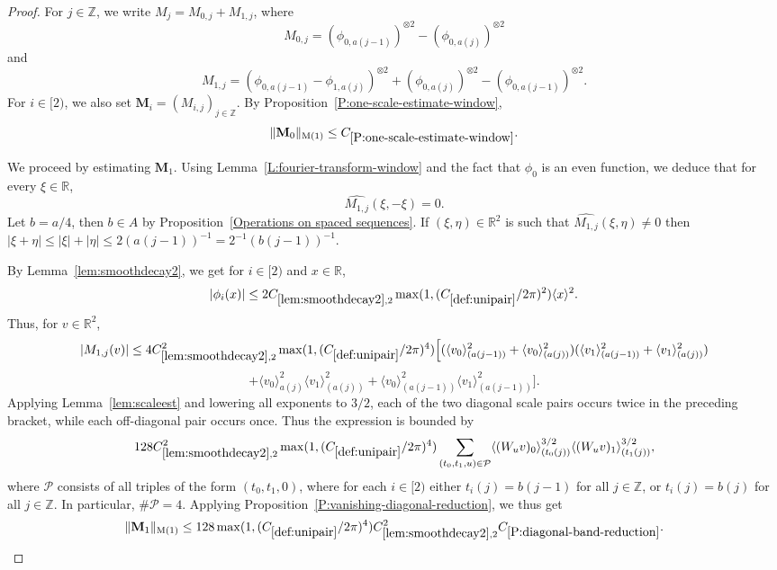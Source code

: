 \documentclass[12pt,reqno]{amsart}
\theoremstyle{plain}
\numberwithin{equation}{section}
\theoremstyle{remark}
\newcommand{\Z}{{\mathbb Z}}
\newcommand{\R}{{\mathbb R}}
\begin{document}
\begin{proof}
For $j\in \Z$, we write $M_j=M_{0,j}+M_{1,j}$, where
\[
M_{0,j}= ({\phi}_{0,a(j-1)})^{\otimes 2} -({\phi}_{0,a(j)})^{\otimes 2}
\]
and
\[
M_{1,j}=({\phi}_{0,a(j-1)}-{\phi}_{1,a(j)})^{\otimes 2} + ({\phi}_{0,a(j)})^{\otimes 2} -({\phi}_{0,a(j-1)})^{\otimes 2}.
\]
For $i\in [2)$, we also set $\mathbf{M}_i=(M_{i,j})_{j\in \Z}$. By Proposition~\ref{P:one-scale-estimate-window},
\[
\|\mathbf{M}_0\|_{\rm M(1)} \leq C_{\ref{P:one-scale-estimate-window}}.
\]

We proceed by estimating $\mathbf{M}_1$.
Using Lemma~\ref{L:fourier-transform-window} and the fact that $\phi_0$ is an even function, we deduce that for every $\xi \in \R$,
\[
\widehat{M_{1,j}}(\xi,-\xi)=0.
\]
Let $b=a/4$, then $b\in A$ by Proposition~\ref{Operations on spaced sequences}.
If $(\xi,\eta) \in \R^2$ is such that $\widehat{M_{1,j}}(\xi,\eta) \neq 0$ then $|\xi+\eta| \leq |\xi|+|\eta| \leq 2(a(j-1))^{-1}=2^{-1} (b(j-1))^{-1}$.

By Lemma~\ref{lem:smoothdecay2}, we get for $i\in [2)$ and $x\in \R$,
\[
|\phi_i(x)| \leq 2 C_{\ref{lem:smoothdecay2},2} \max(1,(C_{\ref{def:unipair}}/2\pi)^2) \langle x \rangle^2.
\]
Thus, for $v\in \R^2$,
\[
|M_{1,j}(v)|
\leq 4 C_{\ref{lem:smoothdecay2},2}^2 \max(1,(C_{\ref{def:unipair}}/2\pi)^4)\Big[
(\langle v_0 \rangle^2_{(a(j-1))}+\langle v_0 \rangle^2_{(a(j))})
(\langle v_1 \rangle^2_{(a(j-1))}+\langle v_1 \rangle^2_{(a(j))})
\]
\[
+\langle v_0 \rangle^2_{a(j)} \langle v_1 \rangle^2_{(a(j))}+\langle v_0 \rangle^2_{(a(j-1))} \langle v_1 \rangle^2_{(a(j-1))} \Big].
\]
Applying Lemma~\ref{lem:scaleest} and lowering all exponents to $3/2$, each of the two diagonal scale pairs occurs twice in the preceding bracket, while each off-diagonal pair occurs once. Thus the expression is bounded by
\[
128 C_{\ref{lem:smoothdecay2},2}^2 \max(1,(C_{\ref{def:unipair}}/2\pi)^4)
\sum_{(t_0,t_1,u) \in \mathcal P} \langle (W_u v)_0 \rangle^{3/2}_{(t_0(j))} \langle (W_u v)_1 \rangle^{3/2}_{(t_1(j))},
\]
where $\mathcal P$ consists of all triples of the form $(t_0,t_1,0)$, where for each $i\in [2)$ either $t_i(j)=b(j-1)$ for all $j\in \Z$, or $t_i(j)=b(j)$ for all $j\in \Z$. In particular, $\# \mathcal P=4$. Applying Proposition~\ref{P:vanishing-diagonal-reduction}, we thus get
\[
\|\mathbf{M}_1\|_{\rm M(1)} \leq 128 \max(1,(C_{\ref{def:unipair}}/2\pi)^4) C_{\ref{lem:smoothdecay2},2}^2C_{\ref{P:diagonal-band-reduction}}.
\]
\end{proof}
\end{document}
